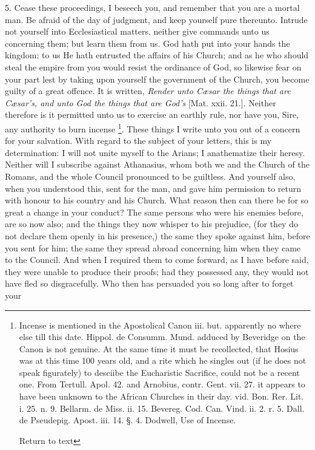 5. Cease these proceedings, I beseech you, and
remember that you are a mortal man. Be afraid of the day of judgment,
and keep yourself pure thereunto. Intrude not yourself into
Ecclesiastical matters, neither give commands unto us concerning them;
but learn them from us. God hath put into your hands the kingdom; to
us He hath entrusted the affairs of his Church; and as he who should
steal the empire from you would resist the ordinance of God, so
likewise fear on your part lest by taking upon yourself the government
of the Church, you become guilty of a great offence. It is written, \emph{Render
unto Cæsar the things that are Cæsar's, and unto God the things that
are God's} [Mat. xxii. 21.]. Neither therefore is it permitted unto
us to exercise an earthly rule, nor have you, Sire, any authority to
burn incense \footnote{Incense is mentioned in the Apostolical Canon
iii. but. apparently no where else till this date. Hippol. de Consumm.
Mund. adduced by Beveridge on the Canon is not genuine. At the same
time it must be recollected, that Hosius was at this time 100 years
old, and a rite which he singles out (if he does not speak figurately)
to desciibe the Eucharistic Sacrifice, could not be a recent one. From
Tertull. Apol. 42. and Arnobius, contr. Gent. vii. 27. it appears to
have been unknown to the African Churches in their day. vid. Bon. Rer.
Lit. i. 25. n. 9. Bellarm. de Miss. ii. 15. Bevereg. Cod. Can. Vind.
ii. 2. r. 5. Dall. de Pseudepig. Apost. iii. 14. §. 4. Dodwell, Use
of Incense.

Return to text}. These
things I write unto you out of a concern for your salvation. With
regard to the subject of your letters, this is my determination: I
will not unite myself to the Arians; I anathematize their heresy.
Neither will I subscribe against Athanasius, whom both we and the
Church of the Romans, and the whole Council pronounced to be
guiltless. And yourself also, when you understood this, sent for the
man, and gave him permission to return with honour to his country and
his Church. What reason then can there be for so great a change in
your conduct? The same persons who were his enemies before, are so now
also; and the things they now whisper to his prejudice, (for they
do not declare them openly in his presence,) the same they spoke
against him, before you sent for him; the same they spread abroad
concerning him when they came to the Council. And when I required them
to come forward, as I have before said, they were unable to produce
their proofs; had they possessed any, they would not have fled so
disgracefully. Who then has persuaded you so long after to forget your
